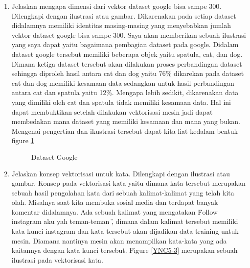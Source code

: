 \begin{enumerate}
\item Jelaskan mengapa dimensi dari vektor dataset google bisa sampe 300. Dilengkapi dengan ilustrasi atau gambar.
	\subitem Dikarenakan pada setiap dataset didalamnya memiliki identitas masing-masing yang menyebabkan jumlah vektor dataset google bisa sampe 300. Saya akan memberikan sebuah ilustrasi yang saya dapat yaitu bagaimana pembagian dataset pada google. Didalam dataset google tersebut memiliki beberapa objek yaitu spatula, cat, dan dog. Dimana ketiga dataset tersebut akan dilakukan proses perbandingan dataset sehingga diproleh hasil antara cat dan dog yaitu 76\% dikarekan pada dataset cat dan dog memiliki kesamaan data sedangkan untuk hasil perbandingan antara cat dan spatula yaitu 12\%. Mengapa lebih sedikit, dikarenakan data yang dimiliki oleh cat dan spatula tidak memiliki kesamaan data. Hal ini dapat membuktikan setelah dilakukan vektorisasi mesin jadi dapat membedakan mana dataset yang memiliki kesamaan dan mana yang bukan. Mengenai pengertian dan ikustrasi tersebut dapat kita liat kedalam bentuk figure \ref{YNC5-5}

	\begin{figure}[ht]
		\caption{Dataset Google}
		\label{YNC5-5}
	\end{figure}

\item Jelaskan konsep vektorisasi untuk kata. Dilengkapi dengan ilustrasi atau gambar.
	\subitem Konsep pada vektorisasi kata yaitu dimana kata tersebut merupakan sebuah hasil pengolahan kata dari sebuah kalimat-kalimat yang telah kita olah. Misalnya saat kita membuka sosial media dan terdapat banyak komentar didalamnya. Ada sebuah kalimat yang mengatakan \" Follow instagram aku yah teman-teman \" , dimana dalam kalimat tersebut memiliki kata kunci instagram dan kata tersebut akan dijadikan data training untuk mesin. Diamana nantinya mesin akan menampilkan kata-kata yang ada kaitannya dengan kata kunci tersebut. Figure \ref{YNC5-3} merupakan sebuah ilustrasi pada vektorisasi kata.


\end{enumerate}
